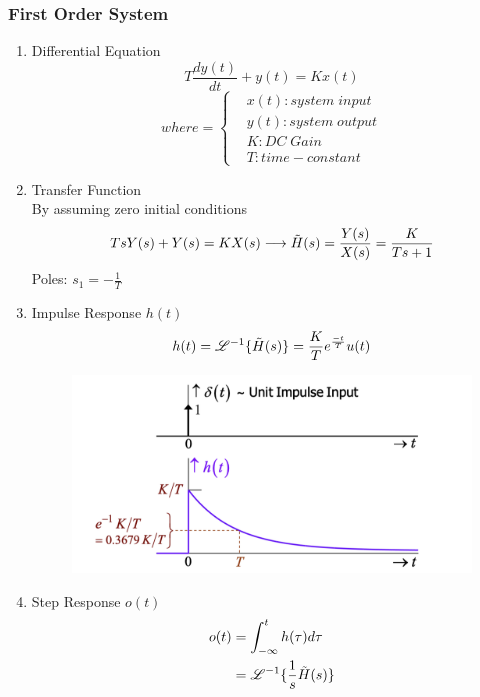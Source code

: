 \subsubsection{First Order System}
\begin{enumerate}
    \item Differential Equation
    \begin{equation}
        T\frac{dy(t)}{dt}+y(t)=Kx(t)
    \end{equation}
    \[
        where = 
        \begin{cases}
            & x(t) : system\;input \\
            & y(t) : system\;output \\
            & K : DC\;Gain\\
            & T : time-constant
        \end{cases}
    \]
    \item Transfer Function \\
    By assuming zero initial conditions
    \begin{multline}
        TsY(s)+Y(s) = KX(s) \longrightarrow \Tilde{H}(s) = \frac{Y(s)}{X(s)}=\frac{K}{Ts+1} \\ 
    \end{multline}
    Poles: $s_1 = - \frac{1}{T}$
    \item Impulse Response $h(t)$
    \begin{equation}
        h(t) = \mathscr{L}^{-1}\{\Tilde{H}(s)\} = \frac{K}{T}e^{\frac{-t}{T}}u(t) 
    \end{equation}
    \begin{figure}[h]
        \centering
        \includegraphics[width=0.75\linewidth]{image/e2ba5c9507c51e791e37c061e3eef1a.png}
    \end{figure}
    \item Step Response $o(t)$
    \begin{align*}
        o(t) &=  \int^t_{-\infty}h(\tau)d\tau \\
         &= \mathscr{L}^{-1}\{\frac{1}{s}\Tilde{H}(s)\} \\

\end{align*}
\end{enumerate}
